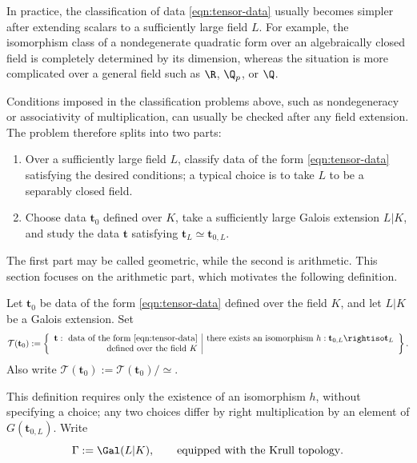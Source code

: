 In practice, the classification of data \eqref{eqn:tensor-data} usually
becomes simpler after extending scalars to a sufficiently large field $L$.
For example, the isomorphism class of a nondegenerate quadratic form over an
algebraically closed field is completely determined by its dimension,
whereas the situation is more complicated over a general field such as
$\R$, $\Q_p$, or $\Q$.

Conditions imposed in the classification problems above, such as
nondegeneracy or associativity of multiplication, can usually be checked
after any field extension. The problem therefore splits into two parts:
\begin{enumerate}
	\item Over a sufficiently large field $L$, classify data of the form
	\eqref{eqn:tensor-data} satisfying the desired conditions; a typical choice
	is to take $L$ to be a separably closed field.
	\item Choose data $\mathbf{t}_0$ defined over $K$, take a sufficiently large
	Galois extension $L|K$, and study the data $\mathbf{t}$ satisfying
	$\mathbf{t}_L\simeq\mathbf{t}_{0,L}$.
\end{enumerate}
The first part may be called geometric, while the second is arithmetic. This
section focuses on the arithmetic part, which motivates the following
definition.

\begin{definition}
	Let $\mathbf{t}_0$ be data of the form \eqref{eqn:tensor-data} defined over
	the field $K$, and let $L|K$ be a Galois extension. Set
	\[
	\mathcal{T}(\mathbf{t}_0):=
	\left\{
	\begin{array}{r|l}
		\mathbf{t}:\text{ data of the form \eqref{eqn:tensor-data}}
		& \text{there exists an isomorphism }h:\mathbf{t}_{0,L}\rightiso\mathbf{t}_L \\
		\text{defined over the field $K$}&
	\end{array}
	\right\}.
	\]
	Also write
	$\mathscr{T}(\mathbf{t}_0):=\mathcal{T}(\mathbf{t}_0)/\simeq$.
\end{definition}

This definition requires only the existence of an isomorphism $h$, without
specifying a choice; any two choices differ by right multiplication by an
element of $G(\mathbf{t}_{0,L})$. Write
\[
\Gamma:=\Gal(L|K),\qquad\text{equipped with the Krull topology}.
\]

